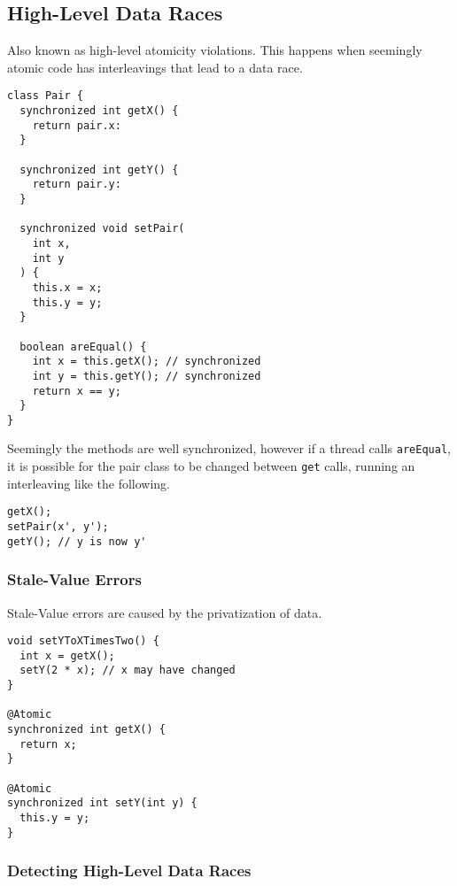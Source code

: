 \subsection{High-Level Data Races}

Also known as high-level atomicity violations.
This happens when seemingly atomic code has interleavings that lead to a data race.

\begin{lstlisting}[caption={Class \texttt{Pair} definition, notice the synchronized methods.}]
class Pair {
  synchronized int getX() {
    return pair.x:
  }

  synchronized int getY() {
    return pair.y:
  }

  synchronized void setPair(
    int x,
    int y
  ) {
    this.x = x;
    this.y = y;
  }

  boolean areEqual() {
    int x = this.getX(); // synchronized
    int y = this.getY(); // synchronized
    return x == y;
  }
}
\end{lstlisting}

Seemingly the methods are well synchronized,
however if a thread calls \texttt{areEqual},
it is possible for the pair class to be changed between \texttt{get} calls,
running an interleaving like the following.

\begin{lstlisting}[caption={Possible incorrect interleaving. Assuming \texttt{y != y'}.}]
getX();
setPair(x', y');
getY(); // y is now y'
\end{lstlisting}

\subsubsection{Stale-Value Errors}

Stale-Value errors are caused by the privatization of data.

\begin{lstlisting}[caption={Stale-Value error example.}]
void setYToXTimesTwo() {
  int x = getX();
  setY(2 * x); // x may have changed
}

@Atomic
synchronized int getX() {
  return x;
}

@Atomic
synchronized int setY(int y) {
  this.y = y;
}
\end{lstlisting}

\subsubsection{Detecting High-Level Data Races}

